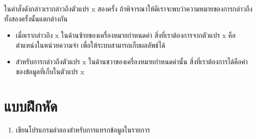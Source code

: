 ใน{\wbr}คำสั่ง{\wbr}ดังกล่าว{\wbr}เรา{\wbr}กล่าว{\wbr}ถึง{\wbr}ตัวแปร {\ct x} สอง{\wbr}ครั้ง{\wbr}
ถ้า{\wbr}พิจารณา{\wbr}ให้{\wbr}ดี{\wbr}เรา{\wbr}จะ{\wbr}พบ{\wbr}ว่าความ{\wbr}หมาย{\wbr}ของ{\wbr}การ{\wbr}กล่าว{\wbr}ถึง{\wbr}ทั้ง{\wbr}สอง{\wbr}ครั้งนั้น{\wbr}แตกต่าง{\wbr}กัน{\wbr}

\begin{itemize}
\item เมื่อ{\wbr}เรา{\wbr}กล่าว{\wbr}ถึง {\ct x} ใน{\wbr}ด้าน{\wbr}ซ้าย{\wbr}ของ{\wbr}เครื่องหมาย{\wbr}กำหนด{\wbr}ค่า{\wbr}
  สิ่ง{\wbr}ที่{\wbr}เรา{\wbr}ต้องการ{\wbr}จาก{\wbr}ตัวแปร {\ct x} คือ{\wbr}ตำแหน่ง{\wbr}ใน{\wbr}หน่วยความจำ{\wbr}
  เพื่อให้{\wbr}ระบบ{\wbr}สามารถ{\wbr}เก็บ{\wbr}ผลลัพธ์{\wbr}ได้{\wbr}
\item สำหรับ{\wbr}การ{\wbr}กล่าว{\wbr}ถึง{\wbr}ตัวแปร {\ct x} ใน{\wbr}ด้าน{\wbr}ขวา{\wbr}ของ{\wbr}เครื่องหมาย{\wbr}กำหนด{\wbr}ค่า{\wbr}นั้น{\wbr}
  สิ่ง{\wbr}ที่{\wbr}เรา{\wbr}ต้องการ{\wbr}ได้{\wbr}คือ{\wbr}ค่า{\wbr}ของ{\wbr}ข้อมูล{\wbr}ที่{\wbr}เก็บ{\wbr}ใน{\wbr}ตัวแปร {\ct x}
\end{itemize}

\section{แบบฝึกหัด}

\begin{enumerate}
\item เขียน{\wbr}โปรแกรม{\wbr}ลำ{\wbr}ลอง{\wbr}สำหรับ{\wbr}การ{\wbr}แทรก{\wbr}ข้อมูล{\wbr}ใน{\wbr}รายการ{\wbr}
\end{enumerate}
